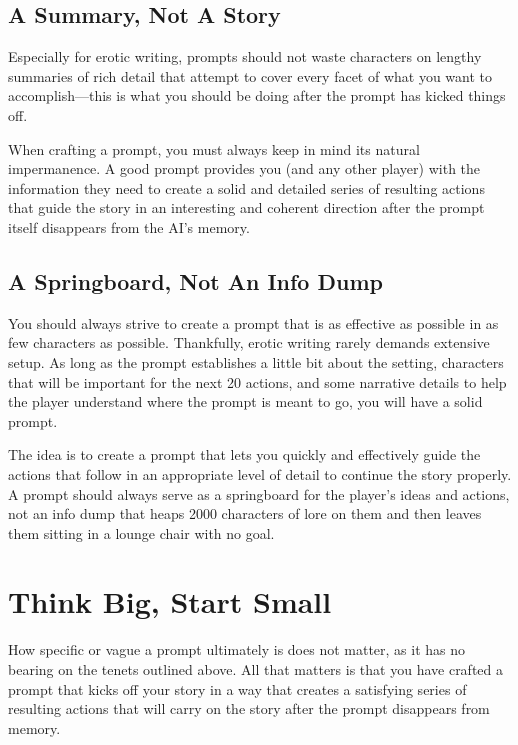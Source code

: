﻿\documentclass[Coomer-main.tex]{subfiles}
\begin{document}
\subsection{A Summary, Not A Story}

Especially for erotic writing, prompts should not waste characters on lengthy summaries of rich detail that attempt to cover every facet of what you want to accomplish—this is what you should be doing after the prompt has kicked things off.

When crafting a prompt, you must always keep in mind its natural impermanence.
A good prompt provides you (and any other player) with the information they need to create a solid and detailed series of resulting actions that guide the story in an interesting and coherent direction after the prompt itself disappears from the AI's memory.

\subsection{A Springboard, Not An Info Dump}

You should always strive to create a prompt that is as effective as possible in as few characters as possible.
Thankfully, erotic writing rarely demands extensive setup.
As long as the prompt establishes a little bit about the setting, characters that will be important for the next 20 actions, and some narrative details to help the player understand where the prompt is meant to go, you will have a solid prompt.

The idea is to create a prompt that lets you quickly and effectively guide the actions that follow in an appropriate level of detail to continue the story properly.
A prompt should always serve as a springboard for the player's ideas and actions, not an info dump that heaps 2000 characters of lore on them and then leaves them sitting in a lounge chair with no goal.

\section{Think Big, Start Small}

How specific or vague a prompt ultimately is does not matter, as it has no bearing on the tenets outlined above.
All that matters is that you have crafted a prompt that kicks off your story in a way that creates a satisfying series of resulting actions that will carry on the story after the prompt disappears from memory.
\end{document}
